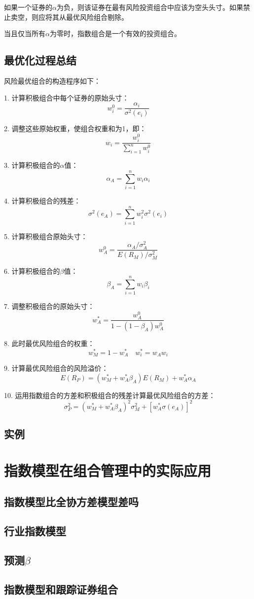 \documentclass{article}
\begin{document}
如果一个证券的$ \alpha $为负，则该证券在最有风险投资组合中应该为空头头寸。如果禁止卖空，则应将其从最优风险组合剔除。

当且仅当所有$ \alpha $为零时，指数组合是一个有效的投资组合。

\subsection{最优化过程总结}
风险最优组合的构造程序如下：

\hspace*{\fill}

1. 计算积极组合中每个证券的原始头寸： 
\[
w^0_i=\frac{\alpha_i}{\sigma^2(e_i)}
\]

2. 调整这些原始权重，使组合权重和为1，即：
\[
w_i=\frac{w_i^0}{\sum_{i=1}^{n}w_i^0} 
\]

3. 计算积极组合的$ \alpha $值：
\[
\alpha_A=\sum_{i=1}^{n}w_i\alpha_i
\]

4. 计算积极组合的残差：
\[
\sigma^2(e_A)=\sum_{i=1}^{n}w_i^2\sigma^2(e_i)
\]

5. 计算积极组合原始头寸：
\[
w_A^0=\frac{\alpha_A/\sigma^2_A}{E(R_M)/\sigma_M^2}
\]

6. 计算积极组合的$ \beta $值：
\[
\beta_A=\sum_{i=1}^{n}w_i\beta_i
\]

7. 调整积极组合的原始头寸：
\[
w_A^*=\frac{w_A^0}{1-(1-\beta_A)w_A^0}
\]

8. 此时最优风险组合的权重：
\[
w_M^*=1-w_A^*\quad w_i^*=w_Aw_i
\]

9. 计算最优风险组合的风险溢价：
\[
E(R_P)=(w_M^*+w_A^*\beta_A)E(R_M)+w_A^*\alpha_A
\]

10. 运用指数组合的方差和积极组合的残差计算最优风险组合的方差：
\[
\sigma_P^2=(w_M^*+w_A^*\beta_A)^2\sigma_M^2+[w_A^*\sigma(e_A)]^2
\]

\subsection{实例}


\section{指数模型在组合管理中的实际应用}
\subsection{指数模型比全协方差模型差吗}

\subsection{行业指数模型}

\subsection{预测$ \beta $}

\subsection{指数模型和跟踪证券组合}
\end{document}
